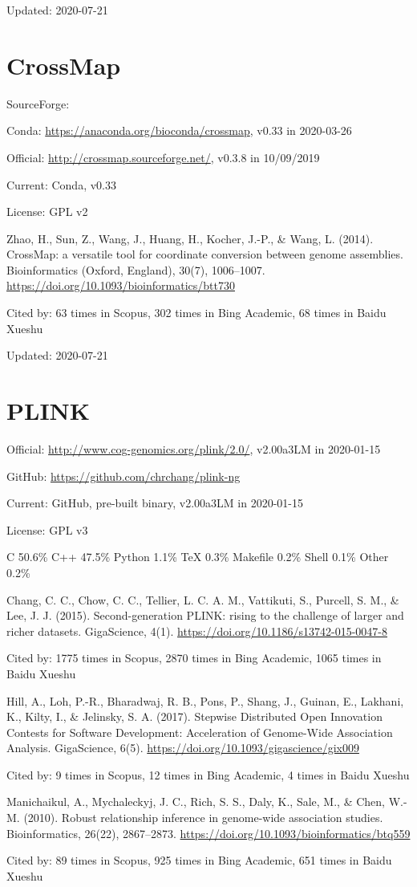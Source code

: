 \documentclass[]{article}
\newcommand{\cb}[3]{\par Cited by: {\color{blue}\Huge #1} times in Scopus, {\color{blue}\Huge #2} times in Bing Academic, {\color{blue}\Huge #3} times in Baidu Xueshu}
\begin{document}
Updated: 2020-07-21

\section{CrossMap}

SourceForge: 

Conda: \url{https://anaconda.org/bioconda/crossmap}, v0.33 in 2020-03-26

Official: \url{http://crossmap.sourceforge.net/}, v0.3.8 in 10/09/2019

Current: Conda, v0.33

License: GPL v2

Zhao, H., Sun, Z., Wang, J., Huang, H., Kocher, J.-P., \& Wang, L. (2014). CrossMap: a versatile tool for coordinate conversion between genome assemblies. Bioinformatics (Oxford, England), 30(7), 1006–1007. \url{https://doi.org/10.1093/bioinformatics/btt730}\cb{63}{302}{68}

Updated: 2020-07-21

\section{PLINK}

Official: \url{http://www.cog-genomics.org/plink/2.0/}, v2.00a3LM in 2020-01-15

GitHub: \url{https://github.com/chrchang/plink-ng}

Current: GitHub, pre-built binary, v2.00a3LM in 2020-01-15

License: GPL v3

C 50.6\% C++ 47.5\% Python 1.1\% TeX 0.3\% Makefile 0.2\% Shell 0.1\% Other 0.2\% 

Chang, C. C., Chow, C. C., Tellier, L. C. A. M., Vattikuti, S., Purcell, S. M., \& Lee, J. J. (2015). Second-generation PLINK: rising to the challenge of larger and richer datasets. GigaScience, 4(1). \url{https://doi.org/10.1186/s13742-015-0047-8}\cb{1775}{2870}{1065}

Hill, A., Loh, P.-R., Bharadwaj, R. B., Pons, P., Shang, J., Guinan, E., Lakhani, K., Kilty, I., \& Jelinsky, S. A. (2017). Stepwise Distributed Open Innovation Contests for Software Development: Acceleration of Genome-Wide Association Analysis. GigaScience, 6(5). \url{https://doi.org/10.1093/gigascience/gix009}\cb{9}{12}{4}

Manichaikul, A., Mychaleckyj, J. C., Rich, S. S., Daly, K., Sale, M., \& Chen, W.-M. (2010). Robust relationship inference in genome-wide association studies. Bioinformatics, 26(22), 2867–2873. \url{https://doi.org/10.1093/bioinformatics/btq559}\cb{89}{925}{651}
\end{document}
